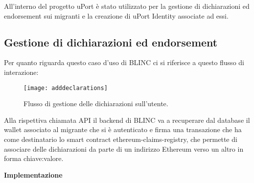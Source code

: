 All’interno del progetto uPort è stato utilizzato per la gestione di dichiarazioni
ed endorsement sui migranti e la creazione di uPort Identity associate ad essi.

\subsection{Gestione di dichiarazioni ed endorsement}
Per quanto riguarda questo caso d’uso di BLINC ci si
riferisce a questo flusso di interazione:

\begin{figure}[!ht]
    \texttt{[image: adddeclarations]}
    \caption{Flusso di gestione delle dichiarazioni sull'utente.}
    \label{fig:adddeclarations}
  \end{figure}

Alla rispettiva chiamata API il backend di BLINC va a recuperare dal database
il wallet associato al migrante che si è autenticato e firma una transazione
che ha come destinatario lo smart contract ethereum-claims-registry, che permette
di associare delle dichiarazioni da parte di un indirizzo Ethereum 
verso un altro in forma chiave:valore.

\textbf{Implementazione}

